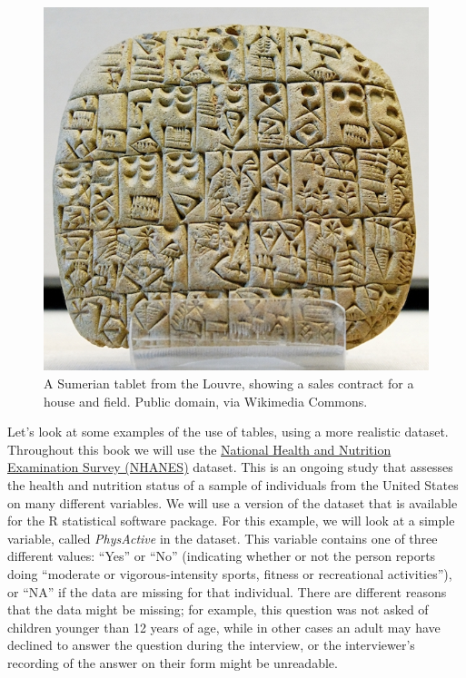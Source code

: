 \documentclass[
  12pt,
]{book}
\begin{document}
\begin{figure}
\includegraphics[width=8in,height=0.3\textheight]{images/Sales_contract_Shuruppak_Louvre_AO3760} \caption{A Sumerian tablet from the Louvre, showing a sales contract for a house and field.  Public domain, via Wikimedia Commons.}\label{fig:salesContract}
\end{figure}

Let's look at some examples of the use of tables, using a more realistic dataset. Throughout this book we will use the \href{https://www.cdc.gov/nchs/nhanes/index.htm}{National Health and Nutrition Examination Survey (NHANES)} dataset. This is an ongoing study that assesses the health and nutrition status of a sample of individuals from the United States on many different variables. We will use a version of the dataset that is available for the R statistical software package. For this example, we will look at a simple variable, called \emph{PhysActive} in the dataset. This variable contains one of three different values: ``Yes'' or ``No'' (indicating whether or not the person reports doing ``moderate or vigorous-intensity sports, fitness or recreational activities''), or ``NA'' if the data are missing for that individual. There are different reasons that the data might be missing; for example, this question was not asked of children younger than 12 years of age, while in other cases an adult may have declined to answer the question during the interview, or the interviewer's recording of the answer on their form might be unreadable.
\end{document}
